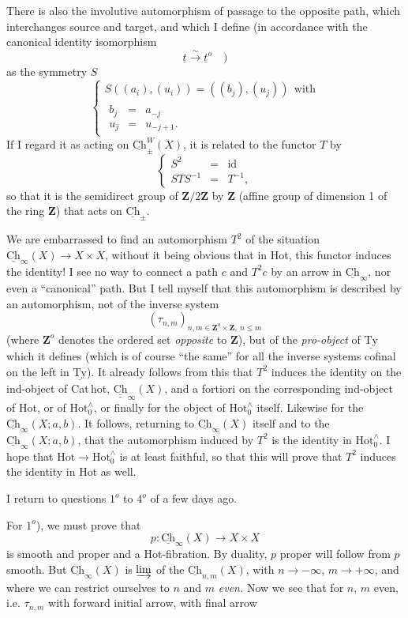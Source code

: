 \documentclass[11pt]{article}
\newcommand{\msp}[1]{\marginpar{\footnotesize [#1]}}
\newcommand{\Ch}{\underline{\mathrm{Ch}}}
\newcommand{\Ty}{\underline{\mathrm{Ty}}}
\begin{document}
There is also the involutive automorphism of passage to the opposite path, which interchanges source and target, and which I define (in accordance with the canonical identity isomorphism
\[
\underline{t} \xrightarrow{\sim} \underline{t}^o \quad )
\]
as the symmetry $S$
\[
\left\{ \begin{array}{l}
S((a_i),(u_i)) = ((b_j),(u_j)) \ \ \text{with} \\[1ex]
\begin{array}{lcl} b_j & = & a_{-j} \\[1ex] u_j & = & u_{-j+1}. \end{array}
\end{array} \right.
\]
If I regard it as acting on $\Ch^{W}_{\pm}(X)$, it is related to the functor $T$ by
\[
\left\{ \begin{array}{rcl}
S^2 & = & \mathrm{id} \\[1ex]
STS^{-1} & = & T^{-1},
\end{array} \right.
\]
so that it is the semidirect group of $\mathbf{Z}/2\mathbf{Z}$ by $\mathbf{Z}$ (affine group of dimension 1 of the ring $\mathbf{Z}$) that acts on $\Ch_{\pm}$.

\msp{page 149}
We are embarrassed to find an automorphism $T^2$ of the situation $\Ch_{\infty}(X) \longrightarrow X \times X$, without it being obvious that in Hot, this functor induces the identity! I see no way to connect a path $c$ and $T^2 c$ by an arrow in $\Ch_{\infty}$, nor even a ``canonical'' path. But I tell myself that this automorphism is described by an automorphism, not of the inverse system %
\[
(\tau_{n,m})_{n,m \in \mathbf{Z}^o \times \mathbf{Z},\ n \leq m}
\]
(where $\mathbf{Z}^o$ denotes the ordered set \textit{opposite} to $\mathbf{Z}$), but of the \textit{pro-object} of $\Ty$ which it defines (which is of course ``the same'' for all the inverse systems cofinal on the left in $\Ty$). It already follows from this that $T^2$ induces the identity on the ind-object of Cat\,hot, $\underline{\underline{\mathrm{Ch}}}_{\infty}(X)$, and a fortiori on the corresponding ind-object of Hot, or of $\mathrm{Hot}^{\wedge}_{0}$, or finally for the object of $\mathrm{Hot}^{\wedge}_{0}$ itself. Likewise for the $\Ch_{\infty}(X; a, b)$. It follows, returning to $\Ch_{\infty}(X)$ itself and to the $\Ch_{\infty}(X; a, b)$, that the automorphism induced by $T^2$ is the identity in $\mathrm{Hot}^{\wedge}_{0}$. I hope that $\mathrm{Hot} \longrightarrow \mathrm{Hot}^{\wedge}_{0}$ is
\msp{page 150}
at least faithful, so that this will prove that $T^2$ induces the identity in Hot as well.

I return to questions $1^o$ to $4^o$ of a few days ago.

For $1^o$), we must prove that
\[
p : \Ch_{\infty}(X) \longrightarrow X \times X
\]
is smooth and proper and a Hot-fibration. By duality, $p$ proper will follow from $p$ smooth. But $\Ch_{\infty}(X)$ is $\varinjlim$ of the $\Ch_{n,m}(X)$, with $n \longrightarrow -\infty$, $m \longrightarrow +\infty$, and where we can restrict ourselves to $n$ and $m$ \textit{even.} Now we see that for $n$, $m$ even, i.e. $\tau_{n,m}$ with forward initial arrow, with final arrow
\end{document}
